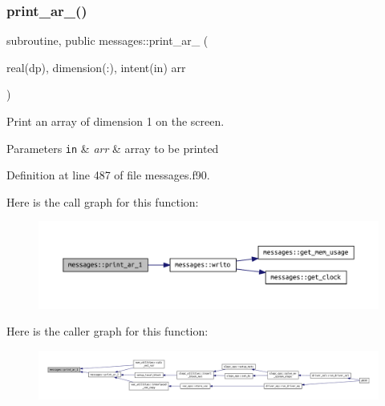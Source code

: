 \subsubsection{\texorpdfstring{print\+\_\+ar\+\_()}{print\_ar\_1()}}
{\footnotesize\ttfamily subroutine, public messages\+::print\+\_\+ar\+\_ (\begin{DoxyParamCaption}\item[{real(dp), dimension(\+:), intent(in)}]{arr }\end{DoxyParamCaption})}



Print an array of dimension 1 on the screen. 


\begin{DoxyParams}[1]{Parameters}
\mbox{\tt in}  & {\em arr} & array to be printed \\
\hline
\end{DoxyParams}


Definition at line 487 of file messages.\+f90.

Here is the call graph for this function\+:\nopagebreak
\begin{figure}[H]
\begin{center}
\leavevmode
\includegraphics[width=350pt]{namespacemessages_a5686118397930f505259225f3688216b_cgraph}
\end{center}
\end{figure}
Here is the caller graph for this function\+:\nopagebreak
\begin{figure}[H]
\begin{center}
\leavevmode
\includegraphics[width=350pt]{namespacemessages_a5686118397930f505259225f3688216b_icgraph}
\end{center}
\end{figure}
\mbox{\label{namespacemessages_a80797cedef6112b8dccaeda431f0c610}} 

